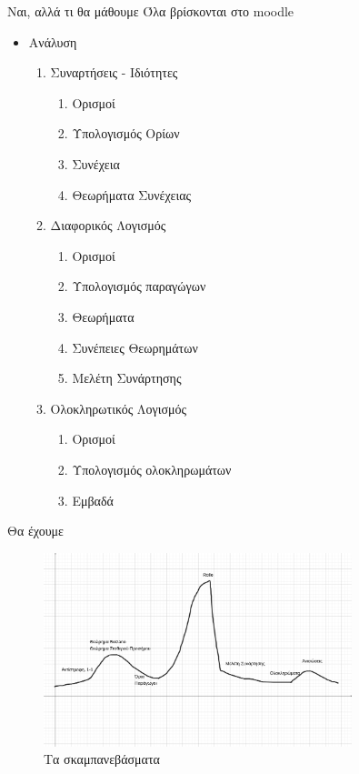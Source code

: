 \documentclass{presentation}
\begin{document}
\begin{frame}{Ναι, αλλά τι θα μάθουμε}
  Όλα βρίσκονται στο moodle
  \begin{itemize}
    \item<1->Ανάλυση \pause
          \begin{enumerate}
            \item Συναρτήσεις - Ιδιότητες
                  \begin{enumerate}
                    \item Ορισμοί
                    \item Υπολογισμός Ορίων
                    \item Συνέχεια
                    \item Θεωρήματα Συνέχειας
                  \end{enumerate}
            \item Διαφορικός Λογισμός
                  \begin{enumerate}
                    \item Ορισμοί
                    \item Υπολογισμός παραγώγων
                    \item Θεωρήματα
                    \item Συνέπειες Θεωρημάτων
                    \item Μελέτη Συνάρτησης
                  \end{enumerate}
            \item Ολοκληρωτικός Λογισμός
                  \begin{enumerate}
                    \item Ορισμοί
                    \item Υπολογισμός ολοκληρωμάτων
                    \item Εμβαδά
                  \end{enumerate}
          \end{enumerate}
  \end{itemize}
\end{frame}

\begin{frame}{Θα έχουμε}
  \begin{figure}
    \centering
    \includegraphics[width=0.8\textwidth]{"images/difficulty"}
    \caption{Τα σκαμπανεβάσματα}
  \end{figure}
\end{frame}
\end{document}
